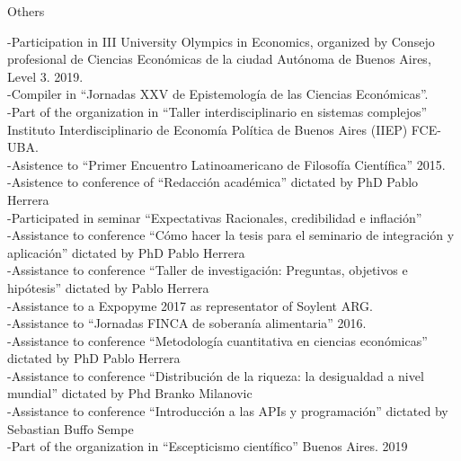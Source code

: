 \documentclass{resume} %
\begin{document}
\begin{rSection}{Others}


-Participation in III University Olympics in Economics, organized by Consejo profesional de Ciencias Económicas de la ciudad Autónoma de Buenos Aires, Level 3. 2019.
\\
-Compiler in “Jornadas XXV de Epistemología de las Ciencias Económicas”.
\\
-Part of the organization in “Taller interdisciplinario en sistemas complejos” Instituto Interdisciplinario de Economía Política de Buenos Aires (IIEP) FCE-UBA.
\\
-Asistence to “Primer Encuentro Latinoamericano de Filosofía Científica” 2015.
\\
-Asistence to conference of “Redacción académica” dictated by PhD Pablo Herrera
\\
-Participated in seminar “Expectativas Racionales, credibilidad e inflación” 
\\
-Assistance to conference “Cómo hacer la tesis para el seminario de integración y aplicación” dictated by PhD Pablo Herrera 
\\
-Assistance to conference “Taller de investigación: Preguntas, objetivos e hipótesis” dictated by Pablo Herrera
\\
-Assistance to a Expopyme 2017 as representator of Soylent ARG.
\\
-Assistance to “Jornadas FINCA de soberanía alimentaria” 2016.
\\
-Assistance to conference “Metodología cuantitativa en ciencias económicas” dictated by PhD Pablo Herrera
\\
-Assistance to conference “Distribución de la riqueza: la desigualdad a nivel mundial” dictated by Phd Branko Milanovic 
\\
-Assistance to conference “Introducción a las APIs y programación” dictated by Sebastian Buffo Sempe 
\\
-Part of the organization in “Escepticismo científico” Buenos Aires. 2019
\end{rSection}
\end{document}

